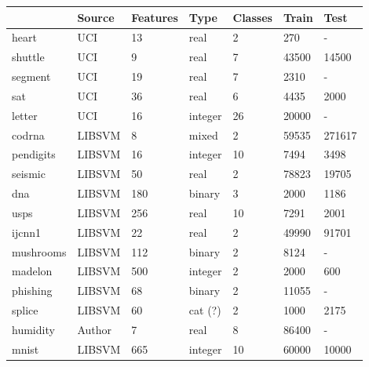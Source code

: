\begin{tabular}{|l|llllll|}
	\hline
	& Source & Features & Type & Classes & Train & Test \\\hline
	heart & UCI & 13 & real & 2 & 270 & - \\
	shuttle & UCI & 9 & real & 7 & 43500 & 14500 \\
	segment & UCI & 19 & real & 7 & 2310 & - \\
	sat & UCI & 36 & real & 6 & 4435 & 2000 \\
	letter & UCI & 16 & integer & 26 & 20000 & - \\
	codrna & LIBSVM & 8 & mixed & 2 & 59535 & 271617 \\
	pendigits & LIBSVM & 16 & integer & 10 & 7494 & 3498 \\
	seismic & LIBSVM & 50 & real & 2 & 78823 & 19705 \\
	dna & LIBSVM & 180 & binary & 3 & 2000 & 1186 \\
	usps & LIBSVM & 256 & real & 10 & 7291 & 2001 \\
	ijcnn1 & LIBSVM & 22 & real & 2 & 49990 & 91701 \\
	mushrooms & LIBSVM & 112 & binary & 2 & 8124 & - \\
	madelon & LIBSVM & 500 & integer & 2 & 2000 & 600 \\
	phishing & LIBSVM & 68 & binary & 2 & 11055 & - \\
	splice & LIBSVM & 60 & cat (?) & 2 & 1000 & 2175 \\
	humidity & Author & 7 & real & 8 & 86400 & - \\
	mnist & LIBSVM & 665 & integer & 10 & 60000 & 10000 \\
	\hline
\end{tabular}

